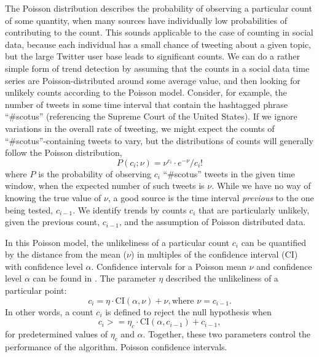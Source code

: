\documentclass{article}
\begin{document}
The Poisson distribution describes the probability of observing a particular
count of some quantity, when many sources have individually low probabilities
of contributing to the count. This sounds applicable to the case of counting in
social data, because each individual has a small chance of tweeting about a
given topic, but the large Twitter user base leads to significant counts. We
can do a rather simple form of trend detection by assuming that the counts in a
social data time series are Poisson-distributed around some average value, and
then looking for unlikely counts according to the Poisson model. Consider, for example,
the number of tweets in some time interval that contain the hashtagged phrase ``\#scotus''
(referencing the Supreme Court of the United States).
If we ignore variations in the overall rate of tweeting, we might expect the
counts of ``\#scotus''-containing tweets to vary, but the distributions of counts
will generally follow the Poisson distribution,
\begin{equation}
    P(c_i;\nu) = \nu^{c_i}\cdot e^{-\nu} / c_i!
\end{equation}
where $P$ is the probability of observing $c_i$ ``\#scotus'' tweets in the given time
window, when the expected number of such tweets is $\nu$. While we have no way of
knowing the true value of $\nu$, a good source is the time interval \textit{previous} to the
one being tested, $c_{i-1}$. We identify trends by counts $c_i$ that are particularly
unlikely, given the previous count, $c_{i-1}$, and the assumption of Poisson
distributed data. 

In this Poisson model, the unlikeliness of a particular count $c_i$ can be
quantified by the distance from the mean ($\nu$) in multiples of the confidence 
interval (CI) with confidence level $\alpha$. Confidence intervals for a Poisson mean $\nu$ and
confidence level $\alpha$ can be found in \cite{George:2012}. 
The parameter $\eta$ described the unlikeliness of a particular point:
\begin{equation}
    c_i = \eta \cdot \textrm{CI}(\alpha, \nu) + \nu, \textrm{where } \nu = c_{i-1}.
\end{equation}
In other words, a count $c_i$ is defined to
reject the null hypothesis when
\begin{equation}
    c_i >= \eta_c \cdot \textrm{CI}(\alpha, c_{i-1}) + c_{i-1},
\end{equation}
for predetermined values of $\eta_c$ and $\alpha$. Together, these two parameters
control the performance of the algorithm. 
Poisson confidence intervals. 
\end{document}
